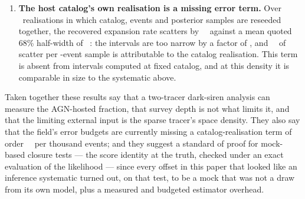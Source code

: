 \begin{enumerate}
\item \textbf{The host catalog's own realisation is a missing error term.} Over
\CloSeedN\ realisations in which catalog, events and posterior samples are
reseeded together, the recovered expansion rate scatters by
\CloSeedScatter~\kmsmpc\ against a mean quoted 68\% half-width of
\CloSeedMeanHw~\kmsmpc: the intervals are too narrow by a factor of
\CloSeedUnderFactor, and \CloCatalogVariance~\kmsmpc\ of scatter per
\CloNobs-event sample is attributable to the catalog realisation. This term is
absent from intervals computed at fixed catalog, and at this density it is
comparable in size to the systematic above.

\end{enumerate}

Taken together these results say that a two-tracer dark-siren analysis can
measure the AGN-hosted fraction, that survey depth is not what limits it, and
that the limiting external input is the sparse tracer's space density. They also
say that the field's error budgets are currently missing a catalog-realisation
term of order \CloCatalogVariance~\kmsmpc\ per thousand events; and they
suggest a standard of proof for mock-based closure tests --- the score
identity at the truth, checked under an exact evaluation of the likelihood ---
since every offset in this paper that looked like an inference systematic
turned out, on that test, to be a mock that was not a draw from its own
model, plus a measured and budgeted estimator overhead.

